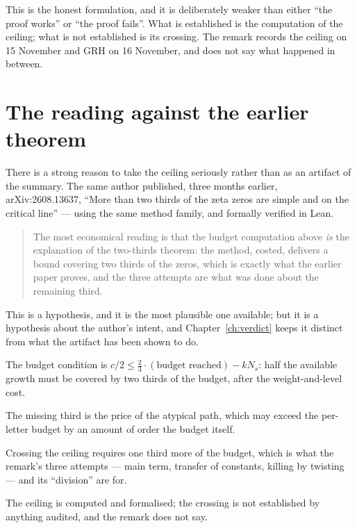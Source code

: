 This is the honest formulation, and it is deliberately weaker than either
``the proof works'' or ``the proof fails''. What is established is the
computation of the ceiling; what is not established is its crossing. The
remark records the ceiling on 15 November and GRH on 16 November, and does not
say what happened in between.

\section{The reading against the earlier theorem}There is a strong reason to take the ceiling seriously rather than as an
artifact of the summary. The same author published, three months earlier,
arXiv:2608.13637, ``More than two thirds of the zeta zeros are simple and on
the critical line'' --- using the same method family, and formally verified in
Lean.

\begin{quote}
The most economical reading is that the budget computation above \emph{is} the
explanation of the two-thirds theorem: the method, costed, delivers a bound
covering two thirds of the zeros, which is exactly what the earlier paper
proves, and the three attempts are what was done about the remaining third.
\end{quote}

This is a hypothesis, and it is the most plausible one available; but it is a
hypothesis about the author's intent, and Chapter~\ref{ch:verdict} keeps it
distinct from what the artifact has been shown to do.

\begin{keytakeaways}
\item The budget condition is $c/2 \le \tfrac23\cdot(\text{budget reached})
- kN_s$: half the available growth must be covered by two thirds of the
budget, after the weight-and-level cost.
\item The missing third is the price of the atypical path, which may exceed
the per-letter budget by an amount of order the budget itself.
\item Crossing the ceiling requires one third more of the budget, which is
what the remark's three attempts --- main term, transfer of constants,
killing by twisting --- and its ``division'' are for.
\item The ceiling is computed and formalised; the crossing is not established
by anything audited, and the remark does not say.
\end{keytakeaways}
